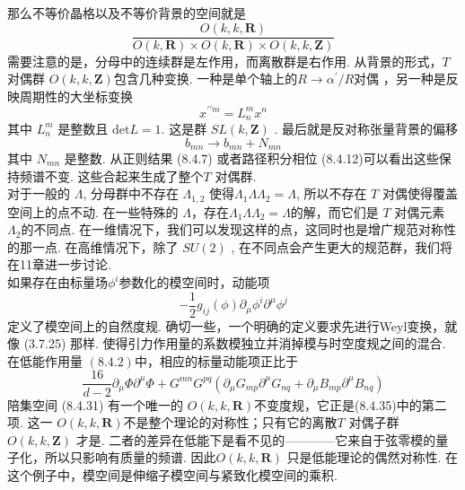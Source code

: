那么不等价晶格以及不等价背景的空间就是
\begin{equation}
	\frac{O(k, k, \mathbf{R})}{O(k, \mathbf{R}) \times O(k, \mathbf{R}) \times O(k, k, \mathbf{Z})}
\end{equation}
需要注意的是，分母中的连续群是左作用，而离散群是右作用. 从背景的形式，$T$对偶群 $O(k, k, \mathbf{Z})$包含几种变换. 一种是单个轴上的$R \rightarrow \alpha^{\prime} / R$对偶 ，另一种是反映周期性的大坐标变换
\begin{equation}
	x^{\prime \prime m}=L_{n}^{m} x^{n}
\end{equation}
其中 $L_{n}^{m}$ 是整数且 $\mathrm{det}L=1$. 这是群 $S L(k, \mathbf{Z})$ . 最后就是反对称张量背景的偏移
\begin{equation}
	b_{m n} \rightarrow b_{m n}+N_{m n}
\end{equation}
其中 $N_{m n}$ 是整数. 从正则结果 (8.4.7) 或者路径积分相位 (8.4.12)可以看出这些保持频谱不变. 这些合起来生成了整个$T$ 对偶群.\\
对于一般的 $\Lambda$, 分母群中不存在 $\Lambda_{1,2}$ 使得$\Lambda_{1} \Lambda \Lambda_{2}=\Lambda$, 所以不存在 $T$ 对偶使得覆盖空间上的点不动. 在一些特殊的 $\Lambda$，存在$\Lambda_{1} \Lambda \Lambda_{2}=\Lambda$的解，而它们是 $T$ 对偶元素 $\Lambda_{2}$的不同点. 在一维情况下，我们可以发现这样的点，这同时也是增广规范对称性的那一点. 在高维情况下，除了 $S U(2)$ , 在不同点会产生更大的规范群，我们将在11章进一步讨论.\\
如果存在由标量场$\phi^{i}$参数化的模空间时，动能项
\begin{equation}
	-\frac{1}{2} g_{i j}(\phi) \partial_{\mu} \phi^{i} \partial^{\mu} \phi^{j}
\end{equation}
定义了模空间上的自然度规. 确切一些，一个明确的定义要求先进行Weyl变换，就像 (3.7.25) 那样. 使得引力作用量的系数模独立并消掉模与时空度规之间的混合. 在低能作用量 $(8.4 .2)$中，相应的标量动能项正比于
\begin{equation}
	\frac{16}{d-2} \partial_{\mu} \Phi \partial^{\mu} \Phi+G^{m n} G^{p q}\left(\partial_{\mu} G_{m p} \partial^{\mu} G_{n q}+\partial_{\mu} B_{m p} \partial^{\mu} B_{n q}\right)
\end{equation}
陪集空间 (8.4.31) 有一个唯一的 $O(k, k, \mathbf{R})$不变度规，它正是(8.4.35)中的第二项. 这一 $O(k, k, \mathbf{R})$不是整个理论的对称性；只有它的离散$T$ 对偶子群 $O(k, k, \mathbf{Z})$ 才是. 二者的差异在低能下是看不见的————它来自于弦零模的量子化，所以只影响有质量的频谱. 因此$O(k, k, \mathbf{R})$ 只是低能理论的偶然对称性. 在这个例子中，模空间是伸缩子模空间与紧致化模空间的乘积.

